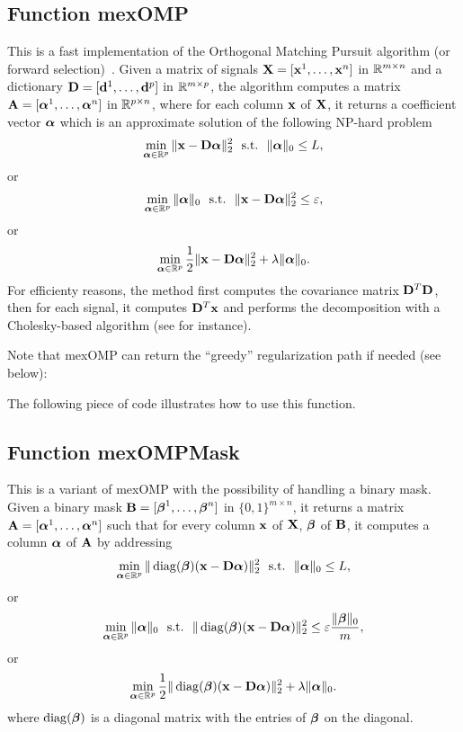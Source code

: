 \documentclass[a4paper, 11pt]{article}
\begin{document}
\subsection{Function mexOMP}
This is a fast implementation of the Orthogonal Matching Pursuit algorithm (or forward selection)~\cite{mallat4,weisberg}. Given a matrix of signals ${\mathbf X}=[{\mathbf x}^1,\ldots,{\mathbf x}^n]$  in ${\mathbb R}^{m \times n}$ and a dictionary ${\mathbf D}=[{\mathbf d}^1,\ldots,{\mathbf d}^p]$ in ${\mathbb R}^{m \times p}$, the algorithm computes a matrix ${\mathbf A}=[{\boldsymbol\alpha}^1,\ldots,{\boldsymbol\alpha}^n]$ in ${\mathbb R}^{p \times n}$,
     where for each column ${\mathbf x}$ of ${\mathbf X}$, it returns a coefficient vector ${\boldsymbol\alpha}$ which is an approximate solution of the following NP-hard problem
     \begin{equation}
     \min_{{\boldsymbol\alpha} \in {\mathbb R}^p} \|{\mathbf x}-{\mathbf D}{\boldsymbol\alpha}\|_2^2 ~~\text{s.t.}~~ \|{\boldsymbol\alpha}\|_0 \leq L,
     \end{equation}
     or 
     \begin{equation}
     \min_{{\boldsymbol\alpha} \in {\mathbb R}^p}  \|{\boldsymbol\alpha}\|_0 ~~\text{s.t.}~~ \|{\mathbf x}-{\mathbf D}{\boldsymbol\alpha}\|_2^2 \leq \varepsilon,
     \end{equation}
     or
     \begin{equation}
     \min_{{\boldsymbol\alpha} \in {\mathbb R}^p} \frac{1}{2}\|{\mathbf x}-{\mathbf D}{\boldsymbol\alpha}\|_2^2 + \lambda \|{\boldsymbol\alpha}\|_0.
     \end{equation}
     For efficienty reasons, the method first computes the covariance matrix
     ${\mathbf D}^T{\mathbf D}$, then for each signal, it computes ${\mathbf D}^T{\mathbf x}$ and performs the
     decomposition with a Cholesky-based algorithm (see \cite{cotter} for instance).

     Note that mexOMP can return the ``greedy'' regularization path if needed (see below):
%    

The following piece of code illustrates how to use this function.



\subsection{Function mexOMPMask}
This is a variant of mexOMP with the possibility of handling a binary mask. 
Given a binary mask ${\mathbf B}=[{\boldsymbol\beta}^1,\ldots,{\boldsymbol\beta}^n]$ in $\{0,1\}^{m \times n}$, it returns a matrix ${\mathbf A}=[{\boldsymbol\alpha}^1,\ldots,{\boldsymbol\alpha}^n]$ such that for every column ${\mathbf x}$ of ${\mathbf X}$, ${\boldsymbol\beta}$ of ${\mathbf B}$, it computes a column ${\boldsymbol\alpha}$ of ${\mathbf A}$ by addressing
\begin{equation}
\min_{{\boldsymbol\alpha} \in {\mathbb R}^p} \|\operatorname{diag}({\boldsymbol\beta})({\mathbf x}-{\mathbf D}{\boldsymbol\alpha})\|_2^2 ~~\text{s.t.}~~ \|{\boldsymbol\alpha}\|_0 \leq L,
   \end{equation}
   or 
   \begin{equation}
   \min_{{\boldsymbol\alpha} \in {\mathbb R}^p}  \|{\boldsymbol\alpha}\|_0 ~~\text{s.t.}~~ \|\operatorname{diag}({\boldsymbol\beta})({\mathbf x}-{\mathbf D}{\boldsymbol\alpha})\|_2^2 \leq \varepsilon\frac{\|{\boldsymbol\beta}\|_0}{m},
   \end{equation}
   or
   \begin{equation}
   \min_{{\boldsymbol\alpha} \in {\mathbb R}^p} \frac{1}{2}\|\operatorname{diag}({\boldsymbol\beta})({\mathbf x}-{\mathbf D}{\boldsymbol\alpha})\|_2^2 +\lambda\|{\boldsymbol\alpha}\|_0.
   \end{equation}
   where $\operatorname{diag}({\boldsymbol\beta})$ is a diagonal matrix with the entries of ${\boldsymbol\beta}$ on the diagonal.
\end{document}
